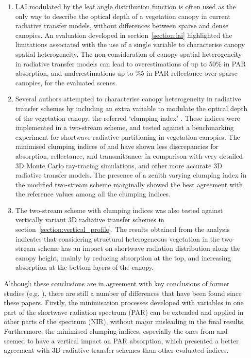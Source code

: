 \begin{enumerate}
\item LAI modulated by the leaf angle distribution function is often used as the only way to describe the optical depth of a vegetation canopy in current radiative transfer models, without differences between sparse and dense canopies. An evaluation developed in section~\ref{section:lai} highlighted the limitations associated with the use of a single variable to characterise canopy spatial heterogeneity. The non-consideration of canopy spatial heterogeneity in radiative transfer models can lead to overestimations of up to 50\% in PAR absorption, and underestimations up to \%5 in PAR reflectance over sparse canopies, for the evaluated scenes.
\item Several authors attempted to characterise canopy heterogeneity in radiative transfer schemes by including an extra variable to modulate the optical depth of the vegetation canopy, the referred `clumping index' \citep{Nilson1971,Kucharik1999,pinty2006,Ni-Meister2010}. These indices were implemented in a two-stream scheme, and tested against a benchmarking experiment for shortwave radiative partitioning in vegetation canopies. The minimised clumping indices of \citet{Nilson1971} and \citet{pinty2006} have shown less discrepancies for absorption, reflectance, and transmittance, in comparison with very detailed 3D Monte Carlo ray-tracing simulations, and other more accurate 3D radiative transfer models. The presence of a zenith varying clumping index in the modified two-stream scheme marginally showed the best agreement with the reference values among all the clumping indices.
\item The two-stream scheme with clumping indices was also tested against vertically variant 3D radiative transfer schemes in section~\ref{section:vertical_profile}. The results obtained from the analysis indicates that considering structural heterogeneous vegetation in the two-stream scheme has an impact on shortwave radiation distribution along the canopy height, mainly by reducing absorption at the top, and increasing absorption at the bottom layers of the canopy.
\end{enumerate} 

Although these conclusions are in agreement with key conclusions of former studies (e.g. \citet{pinty2006,loew2014}), there are still a number of differences that have been found since these papers. Firstly, the minimisation processes developed with variables in one part of the shortwave radiation spectrum (PAR) can be extended and applied in other parts of the spectrum (NIR), without major misleading in the final results. Furthermore, the minimised clumping indices, especially the ones from \citet{Nilson1971} and \citet{pinty2006} seemed to have a vertical impact on PAR absorption, which presented a better agreement with 3D radiative transfer schemes than other evaluated indices. 

